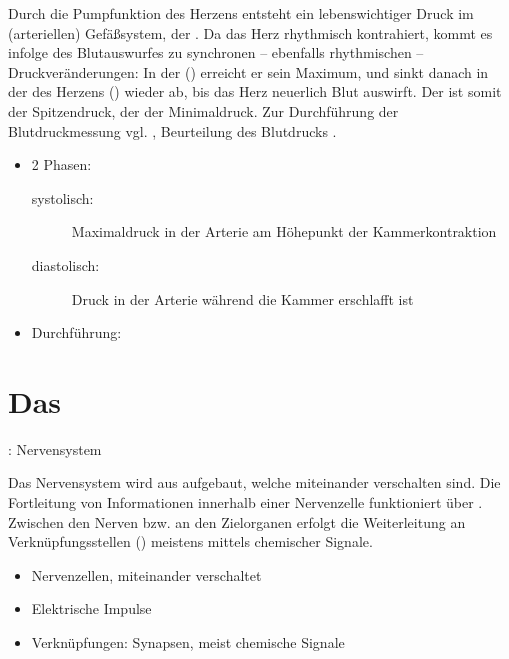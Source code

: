 {\label{topic:blutdruck}%
Durch die Pumpfunktion des Herzens
entsteht ein lebenswichtiger Druck im 
(arteriellen) Gefäßsystem, der
.
Da das Herz rhythmisch kontrahiert, kommt es infolge des
Blutauswurfes zu synchronen -- ebenfalls rhythmischen --
Druckveränderungen: 
In der  () erreicht er sein Maximum,
und sinkt danach in der  des Herzens
() 
wieder ab, 
bis das Herz neuerlich Blut auswirft.
%
Der  
ist somit der Spitzendruck, 
der  
der Minimaldruck. 
%
Zur Durchführung der
Blutdruckmessung vgl.
, Beurteilung des Blutdrucks .



}{%
\begin{itemize}
  \item 2 Phasen:
  \begin{description}
    \item[systolisch:] Maximaldruck in der Arterie am
    Höhepunkt der
    Kammerkontraktion
    \item[diastolisch:] Druck in der Arterie während die
    Kammer erschlafft ist
  \end{description}
  \item Durchführung:

\end{itemize}
}
{}
{}
{}








\clearpage


\section{Das }
 
\TextSlide
{{\TxBeschreibung}: Nervensystem}%
{%
Das Nervensystem wird aus  aufgebaut, welche miteinander verschalten sind. 
Die Fortleitung von Informationen innerhalb einer Nervenzelle funktioniert über
. 
%
Zwischen den Nerven 
bzw. an den Zielorganen 
erfolgt die Weiterleitung 
an Verknüpfungsstellen 
()
meistens mittels chemischer Signale.

}%
{
\begin{itemize}
  \item Nervenzellen, miteinander verschaltet
  \item Elektrische Impulse
  \item Verknüpfungen: Synapsen, meist chemische Signale
\end{itemize}
}%



